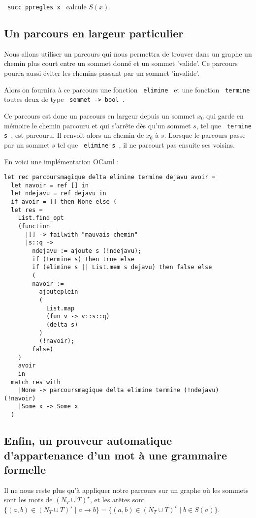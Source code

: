 \documentclass[a4paper,12pt]{article}
\begin{document}
\texttt{ succ ppregles x } calcule $S(x)$.

\subsection{Un parcours en largeur particulier}
Nous allons utiliser un parcours qui nous permettra de trouver dans un graphe un chemin plus court entre un sommet donné et un sommet 'valide'.
Ce parcours pourra aussi éviter les chemins passant par un sommet 'invalide'.

Alors on fournira à ce parcours une fonction \texttt{ elimine } et une fonction \texttt{ termine } toutes deux de type \texttt{ sommet -> bool }.

Ce parcours est donc un parcours en largeur depuis un sommet $x_0$ qui garde en mémoire le chemin parcouru et qui s'arrête dès qu'un 
sommet $s$, tel que \texttt{ termine s }, est parcouru. Il renvoit alors un chemin de $x_0$ à $s$. Lorsque le parcours passe par un sommet $s$ tel que \texttt{ elimine s }, 
il ne parcourt pas ensuite ses voisins.

En voici une implémentation OCaml :

\begin{verbatim}
let rec parcoursmagique delta elimine termine dejavu avoir =
  let navoir = ref [] in
  let ndejavu = ref dejavu in
  if avoir = [] then None else (
  let res = 
    List.find_opt
    (function
      |[] -> failwith "mauvais chemin"
      |s::q ->
        ndejavu := ajoute s (!ndejavu);
        if (termine s) then true else
        if (elimine s || List.mem s dejavu) then false else
        (
        navoir := 
          ajouteplein
          (
            List.map
            (fun v -> v::s::q)
            (delta s)
          )
          (!navoir);
        false)
    )
    avoir
    in
  match res with
    |None -> parcoursmagique delta elimine termine (!ndejavu) (!navoir)
    |Some x -> Some x
  )
\end{verbatim}

\subsection{Enfin, un prouveur automatique d'appartenance d'un mot à une grammaire formelle}

Il ne nous reste plus qu'à appliquer notre parcours sur un graphe où les sommets sont les mots de $(N_T \cup T)^\star$, et les
arêtes sont $\{(a,b) \in  (N_T \cup T)^\star \mid a \rightarrow b\} = \{(a,b) \in  (N_T \cup T)^\star \mid b \in S(a)\}$.
\end{document}
